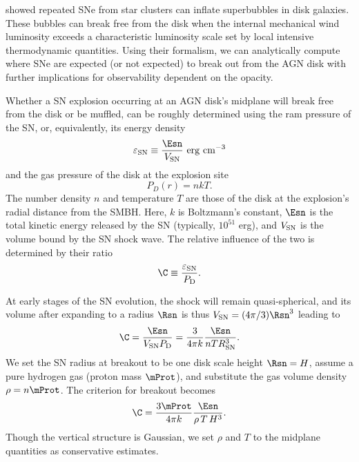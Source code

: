 \citet{MacLowMcCray88} showed repeated SNe from star clusters can inflate superbubbles in disk galaxies.
These bubbles can break free from the disk when the internal mechanical wind luminosity exceeds a characteristic luminosity scale set by local intensive thermodynamic quantities.
Using their formalism, we can analytically compute where SNe are expected (or not expected) to break out from the AGN disk with further implications for observability dependent on the opacity.

Whether a SN explosion occurring at an AGN disk's midplane will break free from the disk or be muffled, can be roughly determined using the ram pressure of the SN, or, equivalently, its energy density
\begin{equation}
    \varepsilon_{\rm SN} \equiv \frac{\Esn}{V_{\rm SN}}\ {\rm erg\ cm^{-3}}
\end{equation}
and the gas pressure of the disk at the explosion site
\begin{equation}
    P_D(r) = n k T.
\end{equation}
The number density $n$ and temperature $T$ are those of the disk at the explosion's radial distance from the SMBH.
Here, $k$ is Boltzmann's constant, $\Esn$ is the total kinetic energy released by the SN (typically, $10^{51}$ erg), and $V_{\rm SN}$ is the volume bound by the SN shock wave.
The relative influence of the two is determined by their ratio
\begin{equation}
    \C \equiv \frac{\varepsilon_{\rm SN}}{P_{\rm D}}.
\end{equation}

At early stages of the SN evolution, the shock will remain quasi-spherical, and its volume after expanding to a radius $\Rsn$ is thus $V_{\rm SN} = (4\pi/3) \Rsn^3$ leading to
\begin{equation}
    \C = \frac{\Esn}{V_{\rm SN}P_{\rm D}} = \frac{3}{4\pi k} \frac{\Esn}{n T R_{\rm SN}^3}.
\end{equation}
We set the SN radius at breakout to be one disk scale height $\Rsn=H$, assume a pure hydrogen gas (proton mass $\mProt$), and substitute the gas volume density $\rho=n\mProt$. The criterion for breakout becomes 
\begin{equation} \label{eqn:C}
    \C = \frac{3\mProt}{4\pi k}\frac{\Esn}{\rho \,T\,H^3}.
\end{equation}
Though the vertical structure is Gaussian, we set $\rho$ and $T$ to the midplane quantities as conservative estimates.

